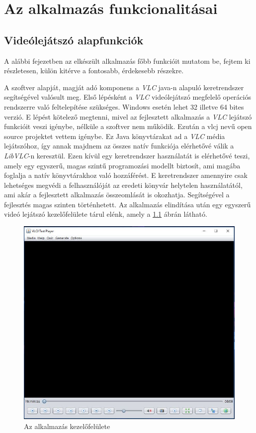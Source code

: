 \chapter{Az alkalmazás funkcionalitásai}

\section{Videólejátszó alapfunkciók}
A alábbi fejezetben az elkészült alkalmazás főbb funkcióit mutatom be, fejtem ki részletesen, külön kitérve a fontosabb, érdekesebb részekre.

A szoftver alapját, magját adó komponens a \textit{VLC} java-n alapuló keretrendszer segítségével valósult meg. Első lépésként a \textit{VLC} videólejátszó megfelelő operációs rendszerre való feltelepítése szükséges. Windows esetén lehet 32 illetve 64 bites verzió. E lépést kötelező megtenni, mivel az fejlesztett alkalmazás a \textit{VLC} lejátszó funkcióit veszi igénybe, nélküle a szoftver nem működik. Ezután a vlcj nevű open source projektet vettem igénybe. Ez Java könyvtárakat ad a \textit{VLC} média lejátszóhoz, így annak majdnem az összes natív funkciója elérhetővé válik a \textit{LibVLC}-n keresztül. Ezen kívül egy keretrendszer használatát is elérhetővé teszi, amely egy egyszerű, magas szintű programozási modellt biztosít, ami magába foglalja a natív könyvtárakhoz való hozzáférést. E keretrendszer amennyire csak lehetséges megvédi a felhasználóját az eredeti könyvár helytelen használatától, ami akár a fejlesztett alkalmazás összeomlását is okozhatja. Segítségével a fejlesztés magas szinten történhetett. Az alkalmazás elindítása után egy egyszerű videó lejátszó kezelőfelülete tárul elénk, amely a \ref{fig:main_screen} ábrán látható.
  
\begin{figure}
\centering
  \includegraphics[width=.8\linewidth]{images/main_screen.jpg}
  \caption{Az alkalmazás kezelőfelülete}
  \label{fig:main_screen}
\end{figure}

